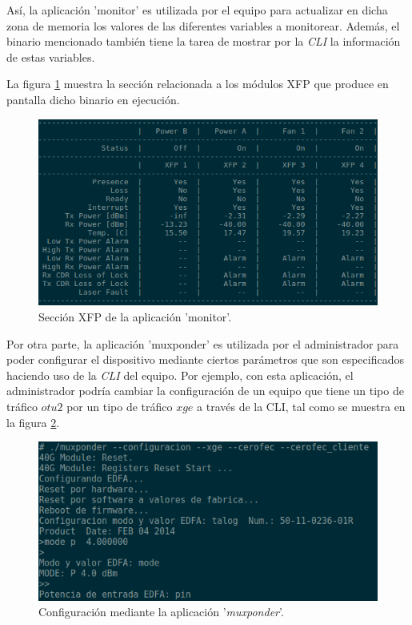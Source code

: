 Así, la aplicación 'monitor' es utilizada por el equipo para actualizar en dicha zona de memoria los valores de las diferentes variables a monitorear. Además, el binario mencionado también tiene la tarea de mostrar por la \textit{CLI} la información de estas variables. 

La figura \ref{fig:monitor} muestra la sección relacionada a los módulos XFP que produce en pantalla dicho binario en ejecución.

\begin{figure}[H]
    \centering
    \includegraphics[scale=0.75]{Figures/monitorapp.png}
    \caption{Sección XFP de la aplicación ’monitor’.}
    \label{fig:monitor}
  \end{figure}

  Por otra parte, la aplicación 'muxponder' es utilizada por el administrador para poder configurar el dispositivo mediante ciertos parámetros que son especificados haciendo uso de la \textit{CLI} del equipo. Por ejemplo, con esta aplicación, el administrador podría cambiar la configuración de un equipo que tiene un tipo de tráfico $otu2$ por un tipo de tráfico $xge$ a través de la CLI, tal como se muestra en la figura \ref{fig:mxpapp}.

  \begin{figure}[H]
    \centering
    \includegraphics[scale=0.6]{Figures/muxponderapp.png}
    \caption{Configuración mediante la aplicación ’\textit{muxponder}’.}
    \label{fig:mxpapp}
  \end{figure}

